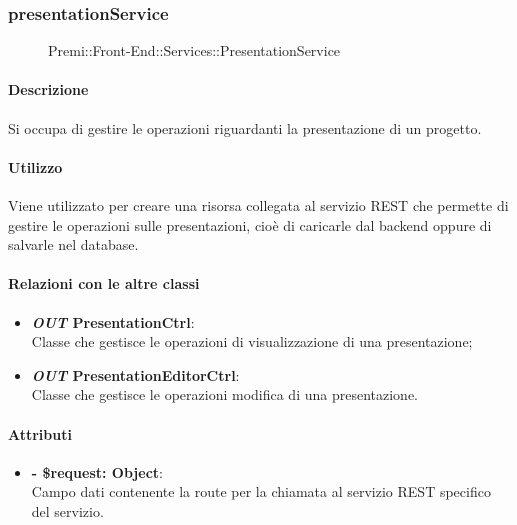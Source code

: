 	
\subsubsection{presentationService}
	\begin{figure}[h]
		\centering
		\caption[Premi::Front-End::Services::PresentationService]{Premi::Front-End::Services::PresentationService}
	\end{figure}
	
	\paragraph{Descrizione}
	Si occupa di gestire le operazioni riguardanti la presentazione di un progetto.
	
	\paragraph{Utilizzo}
	Viene utilizzato per creare una risorsa collegata al servizio REST che permette di gestire le operazioni sulle presentazioni, cioè di caricarle dal backend oppure di salvarle nel database.
	
	\paragraph{Relazioni con le altre classi}
	\begin{itemize}
		\item \textbf{\textit{OUT} PresentationCtrl}:\\
		Classe che gestisce le operazioni di visualizzazione di una presentazione;
		\item \textbf{\textit{OUT} PresentationEditorCtrl}:\\
			Classe che gestisce le operazioni modifica di una presentazione.
	\end{itemize}
	
	\paragraph{Attributi}
	\begin{itemize}
		\item \textbf{- \$request: Object}:\\
		Campo dati contenente la route per la chiamata al servizio REST specifico del servizio.
	\end{itemize}	
	

